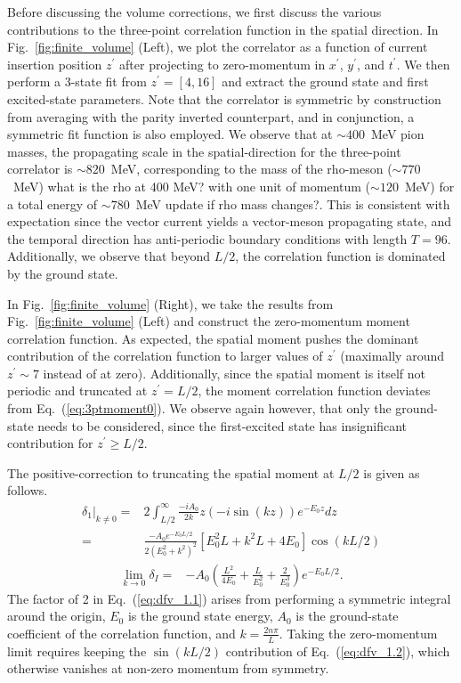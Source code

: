 \documentclass[prd,aps,twocolumn,superscriptaddress,tightenlines,nofootinbib,floatfix,preprintnumbers,10pt]{revtex4-1}
\begin{document}
Before discussing the volume corrections, we first discuss the various contributions to the three-point correlation function in the spatial direction. In Fig.~\ref{fig:finite_volume} (Left), we plot the correlator as a function of current insertion position $z^\prime$ after projecting to zero-momentum in $x^\prime$, $y^\prime$, and $t^\prime$. We then perform a 3-state fit from $z^\prime = [4,16]$ and extract the ground state and first excited-state parameters. Note that the correlator is symmetric by construction from averaging with the parity inverted counterpart, and in conjunction, a symmetric fit function is also employed. We observe that at $\sim 400$~MeV pion masses, the propagating scale in the spatial-direction for the three-point correlator is $\sim 820$~MeV, corresponding to the mass of the rho-meson ($\sim 770$~MeV) {\color{red} what is the rho at 400 MeV?} with one unit of momentum ($\sim 120$~MeV) for a total energy of $\sim780$~MeV {\color{red} update if rho mass changes?}. This is consistent with expectation since the vector current yields a vector-meson propagating state, and the temporal direction has anti-periodic boundary conditions with length $T=96$. Additionally, we observe that beyond $L/2$, the correlation function is dominated by the ground state.

In Fig.~\ref{fig:finite_volume} (Right), we take the results from Fig.~\ref{fig:finite_volume} (Left) and construct the zero-momentum moment correlation function. As expected, the spatial moment pushes the dominant contribution of the correlation function to larger values of $z^\prime$ (maximally around $z^\prime \sim 7$ instead of at zero). Additionally, since the spatial moment is itself not periodic and truncated at $z^\prime = L/2$, the moment correlation function deviates from Eq.~(\ref{eq:3ptmoment0}). We observe again however, that only the ground-state needs to be considered, since the first-excited state has insignificant contribution for $z^\prime \geq L/2$.

The positive-correction to truncating the spatial moment at $L/2$ is given as follows.
\begin{align}
\left.\delta_{1}\right|_{k\neq 0}= & 2\int_{L/2}^{\infty} \frac{-iA_0}{2k} z(-i \sin(kz))e^{-E_0z} dz \label{eq:dfv_1.1}\\
=& \frac{-A_0e^{-E_0L/2}}{2(E_0^2+k^2)^2}\left[E_0^2L+k^2L+4E_0\right]\cos(kL/2) \label{eq:dfv_1.2}
\end{align}
\begin{align}
\lim_{k\rightarrow 0}\delta_{I} =& -A_0\left(\frac{L^2}{4E_0}+\frac{L}{E_0^2}+\frac{2}{E_0^3}\right)e^{-E_0L/2}. \label{eq:dfv_1.0}
\end{align}
The factor of 2 in Eq.~(\ref{eq:dfv_1.1}) arises from performing a symmetric integral around the origin, $E_0$ is the ground state energy, $A_0$ is the ground-state coefficient of the correlation function, and $k=\frac{2n\pi}{L}$. Taking the zero-momentum limit requires keeping the $\sin({kL/2})$ contribution of Eq.~(\ref{eq:dfv_1.2}), which otherwise vanishes at non-zero momentum from symmetry.
\end{document}
